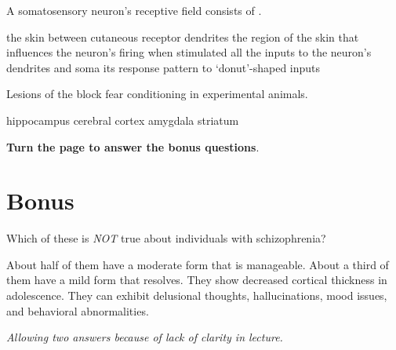 \documentclass[answers]{exam}
\begin{document}
\begin{questions}
\question A somatosensory neuron's receptive field consists of \fillin.
\begin{choices}
\choice the skin between cutaneous receptor dendrites
\correctchoice the region of the skin that influences the neuron's firing when stimulated
\choice all the inputs to the neuron's dendrites and soma
\choice its response pattern to `donut'-shaped inputs
\end{choices}


\question Lesions of the \fillin block fear conditioning in experimental animals.
\begin{choices}
\choice hippocampus
\choice cerebral cortex
\correctchoice amygdala
\choice striatum
\end{choices}

\vspace{2in}
\begin{center}
\textbf{Turn the page to answer the bonus questions}.
\end{center}

\newpage
\section{Bonus}


\question Which of these is \emph{NOT} true about individuals with schizophrenia?
\begin{choices}
\correctchoice About half of them have a moderate form that is manageable.
\correctchoice About a third of them have a mild form that resolves.
\choice They show decreased cortical thickness in adolescence.
\choice They can exhibit delusional thoughts, hallucinations, mood issues, and behavioral abnormalities.
\end{choices}
\emph{Allowing two answers because of lack of clarity in lecture.}


\end{questions}
\end{document}
